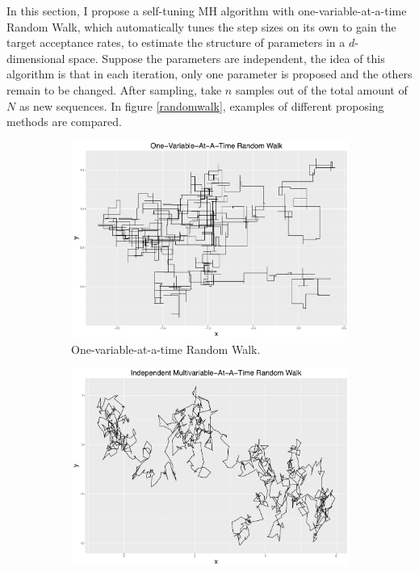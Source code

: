 In this section, I propose a self-tuning MH algorithm with one-variable-at-a-time Random Walk, which automatically tunes the step sizes on its own to gain the target acceptance rates, to estimate the structure of parameters in a $d$-dimensional space. Suppose the parameters are independent, the idea of this algorithm is that in each iteration, only one parameter is proposed and the others remain to be changed. After sampling, take $n$ samples out of the total amount of $N$ as new sequences. In figure \ref{randomwalk}, examples of different proposing methods are compared. 
\begin{figure}[h]
\centering
 \begin{subfigure}[b]{0.32\textwidth}
     \includegraphics[width=\textwidth]{Chapters/05MCMCOU/plots/ggoneRW.pdf}
     \caption{\footnotesize One-variable-at-a-time Random Walk.}\label{MCMConevariableRW}
\end{subfigure}
\begin{subfigure}[b]{0.32\textwidth}
     \includegraphics[width=\textwidth]{Chapters/05MCMCOU/plots/ggindRW.pdf}

\end{subfigure}
\end{figure}
